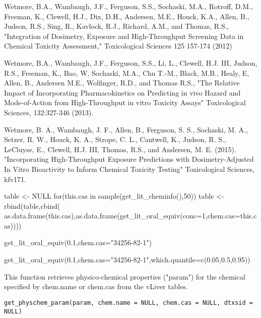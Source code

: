 \documentclass[a4paper]{book}
\begin{document}
\begin{References}\relax
Wetmore, B.A., Wambaugh, J.F., Ferguson, S.S., Sochaski, M.A.,
Rotroff, D.M., Freeman, K., Clewell, H.J., Dix, D.H., Andersen, M.E., Houck,
K.A., Allen, B., Judson, R.S., Sing, R., Kavlock, R.J., Richard, A.M., and
Thomas, R.S., "Integration of Dosimetry, Exposure and High-Throughput
Screening Data in Chemical Toxicity Assessment," Toxicological Sciences 125
157-174 (2012)

Wetmore, B.A., Wambaugh, J.F., Ferguson, S.S., Li, L., Clewell, H.J. III,
Judson, R.S., Freeman, K., Bao, W, Sochaski, M.A., Chu T.-M., Black, M.B.,
Healy, E, Allen, B., Andersen M.E., Wolfinger, R.D., and Thomas R.S., "The
Relative Impact of Incorporating Pharmacokinetics on Predicting in vivo
Hazard and Mode-of-Action from High-Throughput in vitro Toxicity Assays"
Toxicological Sciences, 132:327-346 (2013).

Wetmore, B. A., Wambaugh, J. F., Allen, B., Ferguson, S. S., Sochaski, M.
A., Setzer, R. W., Houck, K. A., Strope, C. L., Cantwell, K., Judson, R. S.,
LeCluyse, E., Clewell, H.J. III, Thomas, R.S., and Andersen, M. E. (2015).
"Incorporating High-Throughput Exposure Predictions with Dosimetry-Adjusted
In Vitro Bioactivity to Inform Chemical Toxicity Testing" Toxicological
Sciences, kfv171.
\end{References}
%
\begin{Examples}
\begin{ExampleCode}

table <- NULL
for(this.cas in sample(get_lit_cheminfo(),50)) table <- rbind(table,cbind(
as.data.frame(this.cas),as.data.frame(get_lit_oral_equiv(conc=1,chem.cas=this.cas))))




get_lit_oral_equiv(0.1,chem.cas="34256-82-1")

get_lit_oral_equiv(0.1,chem.cas="34256-82-1",which.quantile=c(0.05,0.5,0.95))

\end{ExampleCode}
\end{Examples}
%
\begin{Description}\relax
This function retrieves physico-chemical properties ("param") for the chemical specified 
by chem.name or chem.cas from the vLiver tables.
\end{Description}
%
\begin{Usage}
\begin{verbatim}
get_physchem_param(param, chem.name = NULL, chem.cas = NULL, dtxsid = NULL)
\end{verbatim}
\end{Usage}
\end{document}
